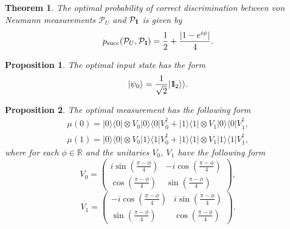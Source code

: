 \documentclass[preprint,12pt, a4paper]{elsarticle}
\newcommand{\ket}[1]{\ensuremath{|#1\rangle}}
\newcommand{\bra}[1]{\ensuremath{\langle#1|}}
\newcommand{\ketbra}[2]{\ensuremath{\ket{#1}\bra{#2}}}
\newcommand{\proj}[1]{\ensuremath{\ketbra{#1}{#1}}}
\newcommand{\1}{{\rm 1\hspace{-0.9mm}l}}
\newcommand{\Id}{{\rm 1\hspace{-0.9mm}l}}
\newcommand{\PP}{\mathcal{P}}
\newtheorem{theorem}{Theorem}
\newtheorem{proposition}{Proposition}
\begin{document}
\begin{theorem}
The optimal probability of correct discrimination between von Neumann
measurements $\PP_U$ and $\PP_{\Id}$ is given by
\begin{equation}
p_{\text{succ}}(\PP_{U}, \PP_{\Id}) = \frac{1}{2} + \frac{|1 - e^{i \phi}  |}{4} .
\end{equation}
\end{theorem}

\begin{proposition}\label{prop-discrim}
 The optimal input state has the form
\begin{equation}
\ket{\psi_{0}} = \frac{1}{\sqrt{2}} |\Id_2 \rangle \rangle.
\end{equation}
\end{proposition}



\begin{proposition}
The  optimal measurement has the following form
\begin{equation}
\begin{split}
\mu(0) = \proj{0} \otimes V_0 \proj{0} V_0^\dagger +  \proj{1} \otimes V_1
\proj{0} V_1^\dagger,   \\
\mu(1) = \proj{0} \otimes V_0 \proj{1} V_0^\dagger +  \proj{1} \otimes V_1
\proj{1} V_1^\dagger,
\end{split}
\end{equation}
where for each $\phi \in \mathbb{R}$ and  the unitaries $V_0$,  $V_1$
have the following form
\begin{equation}
V_0 = \left(\begin{array}{cc}i \sin\left( \frac{\pi - \phi}{4} \right)&-i
\cos\left( \frac{\pi - \phi}{4} \right)\\ \cos\left( \frac{\pi -
\phi}{4}\right)& \sin\left( \frac{\pi - \phi}{4} \right)\end{array}\right),
\end{equation}
\begin{equation}
V_1 = \left(\begin{array}{cc}-i \cos\left(\frac{\pi - \phi}{4}\right) &i
\sin\left( \frac{\pi - \phi}{4}\right)\\\sin\left( \frac{\pi - \phi}{4} \right)
&  \cos\left( \frac{\pi - \phi}{4} \right) \end{array}\right).
\end{equation}
\end{proposition}
\end{document}
